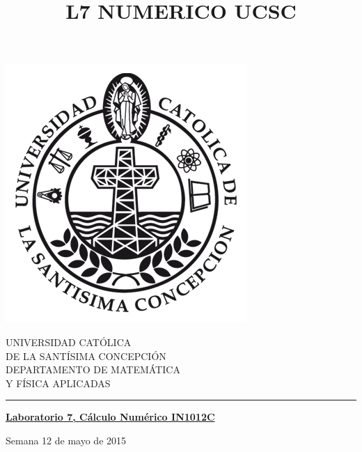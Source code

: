 \documentclass[11pt]{article}
\begin{document}
\title{L7 NUMERICO UCSC}

\begin{minipage}{0.15\textwidth}
\includegraphics[width=\textwidth]{ucsc.png}
\end{minipage}
\begin{minipage}{0.9\textwidth}
{UNIVERSIDAD CAT\'OLICA}\\ 
{DE LA SANT\'ISIMA CONCEPCI\'ON}\\
{DEPARTAMENTO DE MATEM\'ATICA}\\ 
{ Y F\'ISICA APLICADAS}\\
\rule{0.66\textwidth}{.5pt} %
\end{minipage}

\vspace*{0.5cm} \centerline {\bf\underline{Laboratorio 7, C\'alculo Num\'erico  IN1012C }}
\centerline{\textrm{Semana 12 de mayo de 2015}}  \vspace{0.2cm}




\end{document}
